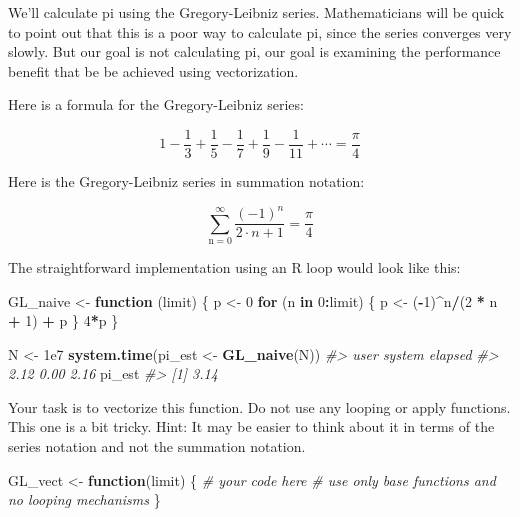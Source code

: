 \documentclass[]{book}
\newenvironment{Shaded}{\begin{snugshade}}{\end{snugshade}}
\newcommand{\KeywordTok}[1]{\textcolor[rgb]{0.13,0.29,0.53}{\textbf{#1}}}
\newcommand{\DecValTok}[1]{\textcolor[rgb]{0.00,0.00,0.81}{#1}}
\newcommand{\FloatTok}[1]{\textcolor[rgb]{0.00,0.00,0.81}{#1}}
\newcommand{\StringTok}[1]{\textcolor[rgb]{0.31,0.60,0.02}{#1}}
\newcommand{\CommentTok}[1]{\textcolor[rgb]{0.56,0.35,0.01}{\textit{#1}}}
\newcommand{\ControlFlowTok}[1]{\textcolor[rgb]{0.13,0.29,0.53}{\textbf{#1}}}
\newcommand{\OperatorTok}[1]{\textcolor[rgb]{0.81,0.36,0.00}{\textbf{#1}}}
\newcommand{\NormalTok}[1]{#1}
\begin{document}
We'll calculate pi using the Gregory-Leibniz series. Mathematicians will
be quick to point out that this is a poor way to calculate pi, since the
series converges very slowly. But our goal is not calculating pi, our
goal is examining the performance benefit that be be achieved using
vectorization.

Here is a formula for the Gregory-Leibniz series:

\begin{equation}
1 - \frac{1}{3} + \frac{1}{5} - \frac{1}{7} + \frac{1}{9} - \frac{1}{11} + \cdots = \frac{\pi}{4}
\end{equation}

Here is the Gregory-Leibniz series in summation notation:

\begin{equation}
\sum_{\text{n}=0}^{\infty} \frac{(-1)^n}{2\cdot n + 1} = \frac{\pi}{4}
\end{equation}

The straightforward implementation using an R loop would look like this:

\begin{Shaded}
\begin{Highlighting}[]
\NormalTok{GL_naive <-}\StringTok{ }\ControlFlowTok{function}\NormalTok{ (limit) \{}
\NormalTok{  p <-}\StringTok{ }\DecValTok{0}
  \ControlFlowTok{for}\NormalTok{ (n }\ControlFlowTok{in} \DecValTok{0}\OperatorTok{:}\NormalTok{limit) \{}
\NormalTok{    p <-}\StringTok{ }\NormalTok{(}\OperatorTok{-}\DecValTok{1}\NormalTok{)}\OperatorTok{^}\NormalTok{n}\OperatorTok{/}\NormalTok{(}\DecValTok{2} \OperatorTok{*}\StringTok{ }\NormalTok{n }\OperatorTok{+}\StringTok{ }\DecValTok{1}\NormalTok{) }\OperatorTok{+}\StringTok{ }\NormalTok{p}
\NormalTok{    \}}
  \DecValTok{4}\OperatorTok{*}\NormalTok{p}
\NormalTok{\}}

\NormalTok{N <-}\StringTok{ }\FloatTok{1e7}
\KeywordTok{system.time}\NormalTok{(pi_est <-}\StringTok{ }\KeywordTok{GL_naive}\NormalTok{(N))}
\CommentTok{#>    user  system elapsed }
\CommentTok{#>    2.12    0.00    2.16}
\NormalTok{pi_est}
\CommentTok{#> [1] 3.14}
\end{Highlighting}
\end{Shaded}

Your task is to vectorize this function. Do not use any looping or apply
functions. This one is a bit tricky. Hint: It may be easier to think
about it in terms of the series notation and not the summation notation.

\begin{Shaded}
\begin{Highlighting}[]
\NormalTok{GL_vect <-}\StringTok{ }\ControlFlowTok{function}\NormalTok{(limit) \{}
  \CommentTok{# your code here}
  \CommentTok{# use only base functions and no looping mechanisms}
\NormalTok{\}}
\end{Highlighting}
\end{Shaded}
\end{document}
